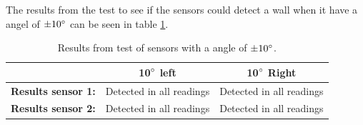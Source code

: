 The results from the test to see if the sensors could detect a wall when it have a angel of $\pm 10 \degree$ can be seen in table \ref{tab:sensorAngelRes}.
\begin{table}[H]
    \centering
    \caption{Results from test of sensors with a angle of $\pm 10 \degree$.}
    \label{tab:sensorAngelRes}
    \begin{tabular}{|c|c|c|}
    \hline
             & \textbf{10$\degree$ left} & \textbf{10$\degree$ Right}  \\ \hline
    \textbf{Results sensor 1:} & Detected in all readings  & Detected in all readings    \\ \hline
    \textbf{Results sensor 2:} & Detected in all readings  & Detected in all readings    \\ \hline
    \end{tabular}
\end{table}

%
